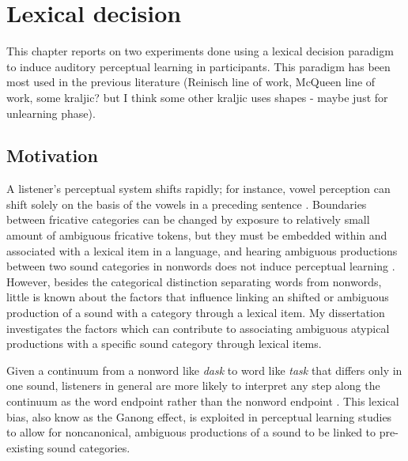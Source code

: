 
\chapter{Lexical decision}

This chapter reports on two experiments done using a lexical decision paradigm to induce auditory perceptual learning in participants.  This paradigm has been most used in the previous literature (Reinisch line of work, McQueen line of work, some kraljic? but I think some other kraljic uses shapes - maybe just for unlearning phase).

\section{Motivation}

A listener's perceptual system shifts rapidly; for instance, vowel perception can shift solely on the basis of the vowels in a  preceding sentence \citep{Ladefoged1957}.  Boundaries between fricative categories can be changed by exposure to relatively small amount of ambiguous fricative tokens, but they must be embedded within and associated with a lexical item in a language, and hearing ambiguous productions between two sound categories in nonwords does not induce perceptual learning \citep{Norris2003}. However, besides the categorical distinction separating words from nonwords, little is known about the factors that influence linking an shifted or ambiguous production of a sound with a category through a lexical item. My dissertation investigates the factors which can contribute to associating ambiguous atypical productions with a specific sound category through lexical items. 

Given a continuum from a nonword like \emph{dask} to word like \emph{task} that differs only in one sound, listeners in general are more likely to interpret any step along the continuum as the word endpoint rather than the nonword endpoint \citep{Ganong1980}. This lexical bias, also know as the Ganong effect, is exploited in perceptual learning studies to allow for noncanonical, ambiguous productions of a sound to be linked to pre-existing sound categories.


